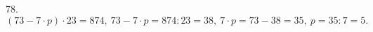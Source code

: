 78. $(73 - 7 \cdot p) \cdot 23 = 874,\ 73 - 7 \cdot p=874:23=38,\ 7 \cdot p=73-38=35,\ p=35:7=5.$\\
